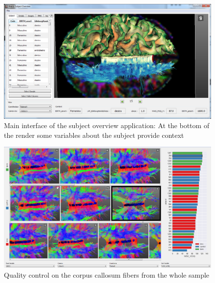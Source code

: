 \documentclass{frontiersHLTH}
\begin{document}
\begin{figure}
\begin{center}
\includegraphics[width=\linewidth]{subj_overview_full}
\end{center}
 \caption{\label{fig_subject}Main interface of the subject overview application: At the bottom of the render some variables about the subject provide context}
\end{figure}

\begin{figure}
\begin{center}
\includegraphics[width=\linewidth]{quality_control_trim}
\end{center}
 \caption{\label{fig_sample} Quality control on the corpus callosum fibers from the whole sample}
\end{figure}
\end{document}
